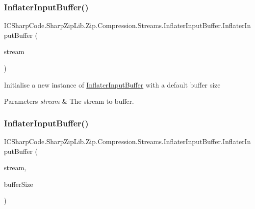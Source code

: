\subsubsection{\texorpdfstring{Inflater\+Input\+Buffer()}{InflaterInputBuffer()}\hspace{0.1cm}{\footnotesize\ttfamily [1/4]}}
{\footnotesize\ttfamily I\+C\+Sharp\+Code.\+Sharp\+Zip\+Lib.\+Zip.\+Compression.\+Streams.\+Inflater\+Input\+Buffer.\+Inflater\+Input\+Buffer (\begin{DoxyParamCaption}\item[{Stream}]{stream }\end{DoxyParamCaption})\hspace{0.3cm}{\ttfamily [inline]}}



Initialise a new instance of \hyperlink{class_i_c_sharp_code_1_1_sharp_zip_lib_1_1_zip_1_1_compression_1_1_streams_1_1_inflater_input_buffer}{Inflater\+Input\+Buffer} with a default buffer size 


\begin{DoxyParams}{Parameters}
{\em stream} & The stream to buffer.\\
\hline
\end{DoxyParams}
\mbox{\label{class_i_c_sharp_code_1_1_sharp_zip_lib_1_1_zip_1_1_compression_1_1_streams_1_1_inflater_input_buffer_acb49a5794ba884055d505b84659b583d}} 
\subsubsection{\texorpdfstring{Inflater\+Input\+Buffer()}{InflaterInputBuffer()}\hspace{0.1cm}{\footnotesize\ttfamily [2/4]}}
{\footnotesize\ttfamily I\+C\+Sharp\+Code.\+Sharp\+Zip\+Lib.\+Zip.\+Compression.\+Streams.\+Inflater\+Input\+Buffer.\+Inflater\+Input\+Buffer (\begin{DoxyParamCaption}\item[{Stream}]{stream,  }\item[{int}]{buffer\+Size }\end{DoxyParamCaption})\hspace{0.3cm}{\ttfamily [inline]}}



